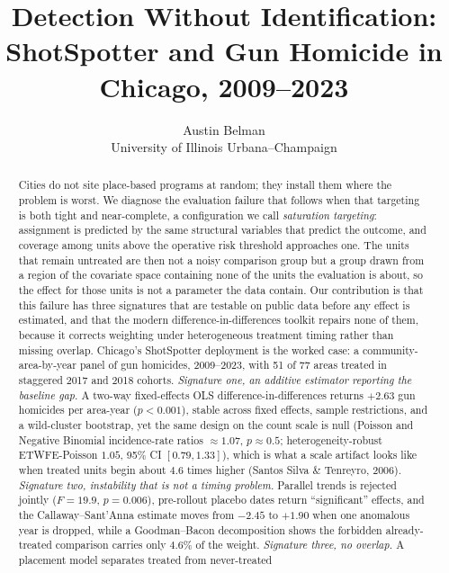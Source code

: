 \documentclass[12pt]{article}
\title{\vspace{-1.5em}\textbf{Detection Without Identification:\\
ShotSpotter and Gun Homicide in Chicago, 2009--2023}}
\author{Austin Belman\\
\small University of Illinois Urbana--Champaign}
\date{}
\begin{document}
\maketitle
\thispagestyle{empty}

\begin{abstract}
\noindent
Cities do not site place-based programs at random; they install them where the problem is
worst. We diagnose the evaluation failure that follows when that targeting is both tight
and near-complete, a configuration we call \emph{saturation targeting}: assignment is
predicted by the same structural variables that predict the outcome, and coverage among
units above the operative risk threshold approaches one. The units that remain untreated
are then not a noisy comparison group but a group drawn from a region of the covariate
space containing none of the units the evaluation is about, so the effect for those units
is not a parameter the data contain. Our contribution is that this failure has three
signatures that are testable on public data before any effect is estimated, and that the
modern difference-in-differences toolkit repairs none of them, because it corrects
weighting under heterogeneous treatment timing rather than missing overlap. Chicago's
ShotSpotter deployment is the worked case: a community-area-by-year panel of gun homicides,
2009--2023, with 51 of 77 areas treated in staggered 2017 and 2018 cohorts.
\emph{Signature one, an additive estimator reporting the baseline gap.}
A two-way fixed-effects OLS difference-in-differences returns $+2.63$ gun homicides per
area-year ($p < 0.001$), stable across fixed effects, sample restrictions, and a wild-cluster
bootstrap, yet the same design on the count scale is null (Poisson and Negative Binomial
incidence-rate ratios $\approx 1.07$, $p \approx 0.5$; heterogeneity-robust ETWFE-Poisson
$1.05$, 95\% CI $[0.79, 1.33]$), which is what a scale artifact looks like when treated
units begin about $4.6$ times higher (Santos Silva \& Tenreyro, 2006). \emph{Signature
two, instability that is not a timing problem.} Parallel trends is rejected jointly ($F =
19.9$, $p = 0.006$), pre-rollout placebo dates return ``significant'' effects, and the
Callaway--Sant'Anna estimate moves from $-2.45$ to $+1.90$ when one anomalous year is
dropped, while a Goodman--Bacon decomposition shows the forbidden already-treated
comparison carries only $4.6\%$ of the weight.
\emph{Signature three, no overlap.} A placement model separates treated from never-treated

\end{abstract}
\end{document}
